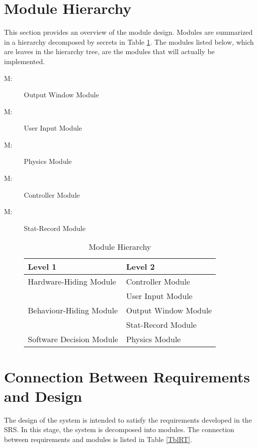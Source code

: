 \documentclass[12pt, titlepage]{article}
\newcounter{mnum}
\newcommand{\mthemnum}{M\themnum}
\begin{document}
\section{Module Hierarchy} \label{SecMH}

This section provides an overview of the module design. Modules are summarized
in a hierarchy decomposed by secrets in Table \ref{TblMH}. The modules listed
below, which are leaves in the hierarchy tree, are the modules that will
actually be implemented.

\begin{description}
\item [ \mthemnum \label{mHH}:] Output Window Module
\item [ \mthemnum \label{mHH}:] User Input Module
\item [ \mthemnum \label{mHH}:] Physics Module
\item [ \mthemnum \label{mHH}:] Controller Module
\item [ \mthemnum \label{mHH}:] Stat-Record Module

\begin{table}[h!]
\centering
\begin{tabular}{p{} p{}}
\toprule
\textbf{Level 1} & \textbf{Level 2}\\
\midrule
{Hardware-Hiding Module} & Controller Module \\
\midrule
\multirow{3}{0.3\textwidth}{Behaviour-Hiding Module} & User Input Module\\
& Output Window Module\\
& Stat-Record Module\\
\midrule
\multirow{1}{0.3\textwidth}{Software Decision Module} & {Physics Module}\\

\bottomrule
\end{tabular}
\caption{Module Hierarchy}
\label{TblMH}
\end{table}

\end{description}




\section{Connection Between Requirements and Design} \label{SecConnection}

The design of the system is intended to satisfy the requirements developed in
the SRS. In this stage, the system is decomposed into modules. The connection
between requirements and modules is listed in Table \ref{TblRT}.
\end{document}
